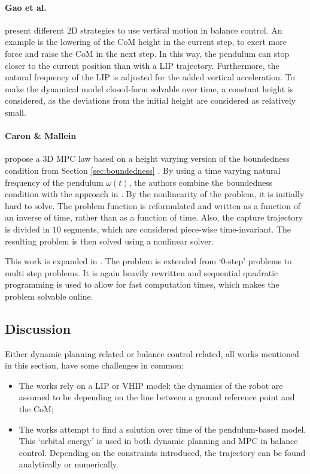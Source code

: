 \paragraph{Gao et al.} present different \ac{2D} strategies to use vertical motion in balance control. An example is the lowering of the \ac{CoM} height in the current step, to exert more force and raise the \ac{CoM} in the next step. In this way, the pendulum can stop closer to the current position than with a \ac{LIP} trajectory. Furthermore, the natural frequency of the \ac{LIP} is adjusted for the added vertical acceleration. To make the dynamical model closed-form solvable over time, a constant height is considered, as the deviations from the initial height are considered as relatively small.

\paragraph{Caron \& Mallein} propose a \ac{3D} \ac{MPC} law based on a height varying version of the boundedness condition from Section \ref{sec:boundedness} \cite{lanari2014boundedness}. By using a time varying natural frequency of the pendulum $\omega(t)$, the authors combine the boundedness condition with the approach in \cite{hopkins2014humanoid}. By the nonlinearity of the problem, it is initially hard to solve. The problem function is reformulated and written as a function of an inverse of time, rather than as a function of time. Also, the capture trajectory is divided in $10$ segments, which are considered piece-wise time-invariant. The resulting problem is then solved using a nonlinear solver.

This work is expanded in \cite{caron2018capturability}. The problem is extended from `0-step' problems to multi step problems. It is again heavily rewritten and sequential quadratic programming is used to allow for fast computation times, which makes the problem solvable online.

\subsection{Discussion}
Either dynamic planning related or balance control related, all works mentioned in this section, have some challenges in common:
\begin{itemize}
	\item The works rely on a \ac{LIP} or \ac{VHIP} model: the dynamics of the robot are assumed to be depending on the line between a ground reference point and the \ac{CoM};
	\item The works attempt to find a solution over time of the pendulum-based model. This `orbital energy' is used in both dynamic planning and \ac{MPC} in balance control. Depending on the constraints introduced, the trajectory can be found analytically or numerically.
\end{itemize}


